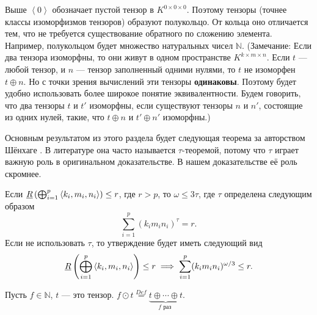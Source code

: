 Выше $\left\langle 0 \right\rangle$ обозначает пустой тензор в $K^{0 \times 0 \times 0}$. Поэтому тензоры (точнее классы изоморфизмов тензоров) образуют полукольцо. От кольца оно отличается тем, что не требуется существование обратного по сложению элемента. Например, полукольцом будет множество натуральных чисел $\mathbb{N}$. (Замечание: Если два тензора изоморфны, то они живут в одном пространстве $K^{k \times m \times n}$. Если $t$ --- любой тензор, и $n$ --- тензор заполненный одними нулями, то $t$ не изоморфен $t \oplus n$. Но с точки зрения вычислений эти тензоры \textbf{одинаковы}. Поэтому будет удобно использовать более широкое понятие эквивалентности. Будем говорить, что два тензоры $t$ и $t'$ изоморфны, если существуют тензоры $n$ и $n'$, состоящие из одних нулей, такие, что $t \oplus n$ и $t' \oplus n'$ изоморфны.) 

Основным результатом из этого раздела будет следующая теорема за авторством Шёнхаге \cite{Schonhage81}. В литературе она часто называется $\tau$-теоремой, потому что $\tau$ играет важную роль в оригинальном доказательстве. В нашем доказательстве её роль скромнее.

\begin{theorem}\label{th:bi:6.4} Если $\underline{R}\left(\bigoplus_{i=1}^p \left\langle k_i, m_i, n_i \right\rangle\right) \leq r$, где $r > p$, то $\omega \leq 3 \tau$, где $\tau$ определена следующим образом
\[
	\sum_{i=1}^p (k_i m_i n_i)^{\tau} = r.
\]
Если не использовать $\tau$, то утверждение будет иметь следующий вид
\[
	\underline{R}\left(\bigoplus_{i=1}^p \left\langle k_i, m_i, n_i \right\rangle\right) \leq r \implies \sum_{i=1}^p (k_i m_i n_i)^{\omega/3} \leq r.
\]
\end{theorem}

\begin{notation}
  Пусть $f \in \mathbb{N}$, $t$ --- это тензор. $f \odot t \overset{Def}{=} \underbrace{t \oplus \dotsb \oplus t}_{f \text{ раз }}$.
\end{notation}

